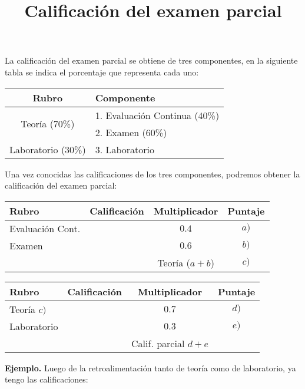 \documentclass[14pt]{extarticle}
\title{\vspace*{-2cm} Calificación del examen parcial\vspace{-5ex}}
\date{}
\begin{document}
\maketitle

La calificación del examen parcial se obtiene de tres componentes, en la siguiente tabla se indica el porcentaje que representa cada uno:
\begin{table}[H]
\centering
\begin{tabular}{| c | l |} \hline
Rubro & Componente \\ \hline
\multirow{2}{*}{Teoría (70\%)} & 1. Evaluación Continua (40\%) \\
 & 2. Examen (60\%) \\ \hline
Laboratorio (30\%) & 3. Laboratorio \\ \hline
\end{tabular}
\end{table}
Una vez conocidas las calificaciones de los tres componentes, podremos obtener la calificación del examen parcial:
\begin{table}[H]
    \centering
    \begin{tabular}{| l | c | c | c |} \hline
        Rubro & Calificación & Multiplicador & Puntaje \\ \hline
        Evaluación Cont. &  & $0.4$ & $a) $ \\ \hline
        Examen & & $0.6$ & $b)$ \\ \hline
         & & Teoría ($a + b$) & $c)$ \\ \hline
    \end{tabular}
\end{table}
\begin{table}[H]
    \centering
    \begin{tabular}{| l | c | c | c |} \hline
        Rubro & Calificación & Multiplicador & Puntaje \\ \hline
        Teoría $c)$ & & $0.7$ & $d)$ \\ \hline
        Laboratorio & & $0.3$ & $e)$ \\ \hline
         & & Calif. parcial $d + e$ & \\ \hline        
    \end{tabular}
\end{table}
\noindent
\textbf{Ejemplo.} Luego de la retroalimentación tanto de teoría como de laboratorio,  ya tengo las calificaciones:
\end{document}

